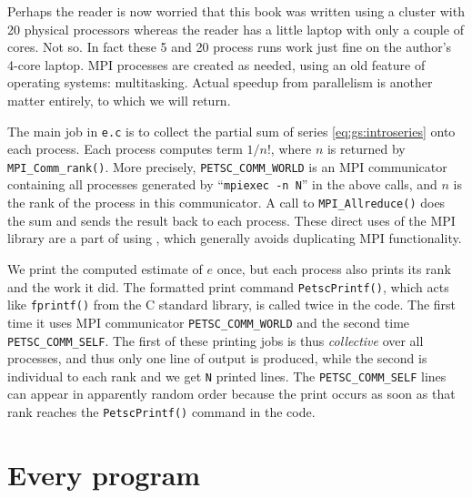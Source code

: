 
Perhaps the reader is now worried that this book was written using a cluster with 20 physical processors whereas the reader has a little laptop with only a couple of cores.  Not so.  In fact these 5 and 20 process runs work just fine on the author's 4-core laptop.  MPI processes are created as needed, using an old feature of operating systems: multitasking.  Actual speedup from parallelism is another matter entirely, to which we will return.

The main job in \texttt{e.c} is to collect the partial sum of series \eqref{eq:gs:introseries} onto each process.  Each process computes term $1/n!$, where $n$ is returned by \texttt{MPI\_Comm\_rank()}.  More precisely, \texttt{PETSC\_COMM\_WORLD} is an MPI communicator \citep{Groppetal1999} containing all processes generated by ``\texttt{mpiexec -n N}'' in the above calls, and $n$ is the rank of the process in this communicator.  A call to \texttt{MPI\_Allreduce()} does the sum and sends the result back to each process.  These direct uses of the MPI library are a part of using \PETSc, which generally avoids duplicating MPI functionality.

We print the computed estimate of $e$ once, but each process also prints its rank and the work it did.  The formatted print command \texttt{PetscPrintf()}, which acts like \texttt{fprintf()} from the C standard library, is called twice in the code.  The first time it uses MPI communicator \texttt{PETSC\_COMM\_WORLD} and the second time \texttt{PETSC\_COMM\_SELF}.  The first of these printing jobs is thus \emph{collective} over all processes, and thus only one line of output is produced, while the second is individual to each rank  and we get \texttt{N} printed lines.  The \texttt{PETSC\_COMM\_SELF} lines can appear in apparently random order because the print occurs as soon as that rank reaches the \texttt{PetscPrintf()} command in the code.


\section{Every \PETSc program}

